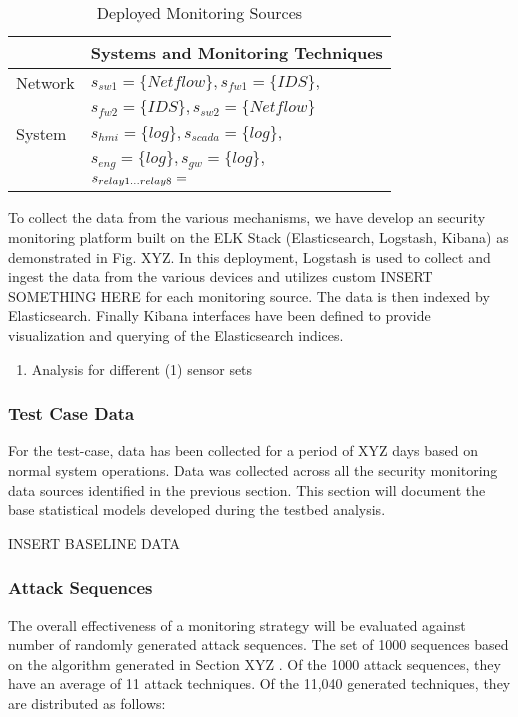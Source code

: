 \documentclass[journal]{IEEEtran}
\begin{document}
\begin{table}
\centering
\caption{Deployed Monitoring Sources}
\label{monitoring_deploy}
\begin{tabular}{|l|l|}\hline
        & Systems and Monitoring Techniques   \\ \hline
Network & $s_{sw1} = \{ Netflow \}, s_{fw1} = \{ IDS \},$  \\
		& $s_{fw2} = \{ IDS \}, s_{sw2} = \{ Netflow \}$   \\\hline
System  & $s_{hmi} = \{ log \}, s_{scada} = \{ log \}, $   \\ 
		& $s_{eng} = \{ log \}, s_{gw} = \{ log \}, $      \\
        & $s_{relay1...relay8} = \empty$  \\ \hline
	
\end{tabular}
\end{table}

To collect the data from the various mechanisms, we have develop an security monitoring platform built on the ELK Stack (Elasticsearch, Logstash, Kibana) as demonstrated in Fig. XYZ. In this deployment, Logstash is used to collect and ingest the data from the various devices and utilizes custom INSERT SOMETHING HERE for each monitoring source. The data is then indexed  by Elasticsearch. Finally Kibana interfaces have been defined to provide visualization and querying of the Elasticsearch indices. 


\begin{enumerate}
\item Analysis for different (1) sensor sets
\end{enumerate}


\subsubsection{Test Case Data}
For the test-case, data has been collected for a period of \color{red} XYZ days \color{black} based on normal system operations. Data was collected across all the security monitoring data sources identified in the previous section. This section will document the base statistical models developed during the testbed analysis. 

\color{red}
INSERT BASELINE DATA
\color{black}

\subsubsection{Attack Sequences}
The overall effectiveness of a monitoring strategy will be evaluated against number of randomly generated attack sequences. The set of 1000 sequences based on the algorithm generated in Section \color{red} XYZ \color{black}. Of the 1000 attack sequences, they have an average of 11 attack techniques. Of the 11,040 generated techniques, they are distributed as follows: 
\end{document}
